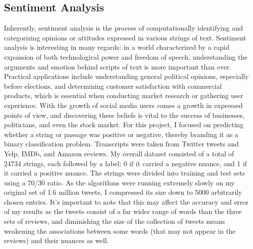 \documentclass[11pt, a4paper]{article} %
\begin{document}
\subsection{Sentiment Analysis} %
Inherently, sentiment analysis is the process of computationally identifying and categorizing opinions or attitudes expressed in various strings of text. Sentiment analysis is interesting in many regards: in a world characterized by a rapid expansion of both technological power and freedom of speech, understanding the arguments and emotion behind scripts of text is more important than ever. Practical applications include understanding general political opinions, especially before elections, and determining customer satisfaction with commercial products, which is essential when conducting market research or gathering user experience. With the growth of social media users comes a growth in expressed points of view, and discovering these beliefs is vital to the success of businesses, politicians, and even the stock market.
\newline\newline 
For this project, I focused on predicting whether a string or passage was positive or negative, thereby branding it as a binary classification problem. Transcripts were taken from Twitter tweets and Yelp, IMDb, and Amazon reviews. My overall dataset consisted of a total of 24734 strings, each followed by a label: 0 if it carried a negative nuance, and 1 if it carried a positive nuance. The strings were divided into training and test sets using a 70/30 ratio. As the algorithms were running extremely slowly on my original set of 1.6 million tweets, I compressed its size down to 5000 arbitrarily chosen entries. It's important to note that this may affect the accuracy and error of my results as the tweets consist of a far wider range of words than the three sets of reviews, and diminishing the size of the collection of tweets means weakening the associations between some words (that may not appear in the reviews) and their nuances as well. 
\end{document}
